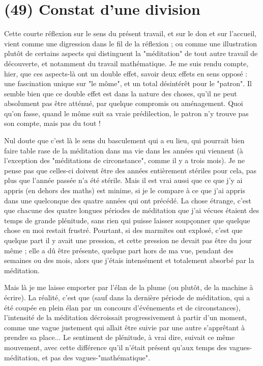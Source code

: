 \section{(49) Constat d'une division}

Cette courte réflexion sur le sens du présent travail, et sur le don et sur l'accueil, vient comme une digression dans le fil de la réflexion ; ou comme une illustration plutôt de certains aspects qui distinguent la "méditation" de tout autre travail de découverte, et notamment du travail mathématique. Je me suis rendu compte, hier, que ces aspects-là ont un double effet, savoir deux effets en sens opposé : une fascination unique sur "le môme", et un total désintérêt pour le "patron". Il semble bien que ce double effet est dans la nature des choses, qu'il ne peut absolument pas être atténué, par quelque compromis ou aménagement. Quoi qu'on fasse, quand le môme suit sa vraie prédilection, le patron n'y trouve pas son compte, mais pas du tout !

Nul doute que c'est là le sens du basculement qui a eu lieu, qui pourrait bien faire table rase de la méditation dans ma vie dans les années qui viennent (à l'exception des "méditations de circonstance", comme il y a trois mois). Je ne pense pas que celles-ci doivent être des années entièrement stériles pour cela, pas plus que l’année passée n'a été stérile. Mais il est vrai aussi que ce que j'y ai appris (en dehors des maths) est minime, si je le compare à ce que j'ai appris dans une quelconque des quatre années qui ont précédé. La chose étrange, c'est que chacune des quatre longues périodes de méditation que j’ai vécues étaient des temps de grande plénitude, sans rien qui puisse laisser soupçonner que quelque chose en moi restait frustré. Pourtant, si des marmites ont explosé, c'est que quelque part il y avait une pression, et cette pression ne devait pas être du jour même ; elle a dû être présente, quelque part hors de ma vue, pendant des semaines ou des mois, alors que j’étais intensément et totalement absorbé par la méditation.

Mais là je me laisse emporter par l’élan de la plume (ou plutôt, de la machine à écrire). La réalité, c’est que (sauf dans la dernière période de méditation, qui a été coupée en plein élan par un concours d’événements et de circonstances), l'intensité de la méditation décroissait progressivement à partir d'un moment, comme une vague justement qui allait être suivie par une autre s'apprêtant à prendre sa place... Le sentiment de plénitude, à vrai dire, suivait ce même mouvement, avec cette différence qu’il n’était présent qu’aux temps des vagues-méditation, et pas des vagues-"mathématique".

